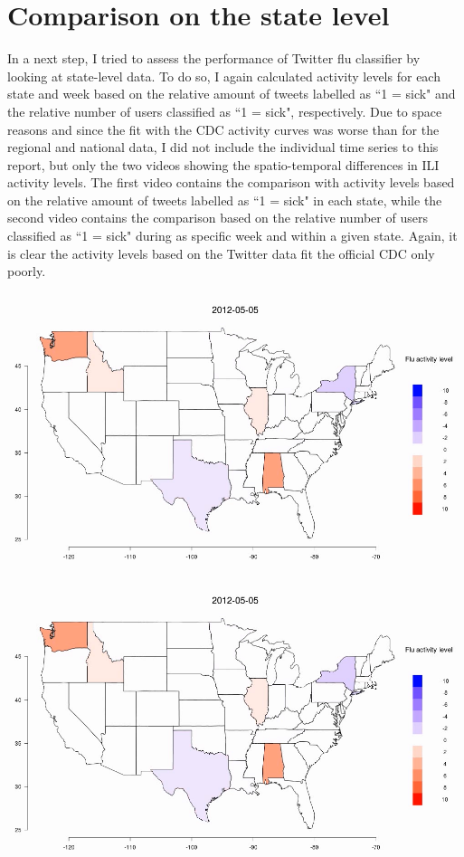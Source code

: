 \documentclass[11pt, a4paper,twoside]{report}\usepackage[]{graphicx}\usepackage[]{color}
\begin{document}
\raggedright

\section{Comparison on the state level}
In a next step, I tried to assess the performance of Twitter flu classifier by looking at state-level data. To do so, I again calculated activity levels for each state and week based on the relative amount of tweets labelled as ``1 = sick" and the relative number of users classified as ``1 = sick", respectively. Due to space reasons and since the fit with the CDC activity curves was worse than for the regional and national data, I did not include the individual time series to this report, but only the two videos showing the spatio-temporal differences in ILI activity levels. The first video contains the comparison with activity levels based on the relative amount of tweets labelled as ``1 = sick" in each state, while the second video contains the comparison based on the relative number of users classified as ``1 = sick" during as specific week and within a given state. Again, it is clear the activity levels based on the Twitter data fit the official CDC only poorly.\newline

\centering \href{run:vids/state_Twitter_cdc_diff_full_rel_sick.avi}{\includegraphics[scale=0.5]{vids/ScreenshotState.png}} 

\bigskip

\centering \href{run:vids/state_Twitter_cdc_diff_full_rel_sick_user.avi}{\includegraphics[scale=0.5]{vids/ScreenshotState.png}} 
\end{document}
